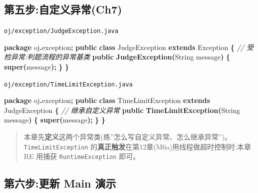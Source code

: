 \documentclass[
  11pt,
]{ctexart}
\newenvironment{Shaded}{\begin{snugshade}}{\end{snugshade}}
\newcommand{\BuiltInTok}[1]{#1}
\newcommand{\CommentTok}[1]{\textcolor[rgb]{0.56,0.35,0.01}{\textit{#1}}}
\newcommand{\FunctionTok}[1]{\textcolor[rgb]{0.13,0.29,0.53}{\textbf{#1}}}
\newcommand{\ImportTok}[1]{#1}
\newcommand{\KeywordTok}[1]{\textcolor[rgb]{0.13,0.29,0.53}{\textbf{#1}}}
\newcommand{\NormalTok}[1]{#1}
\newcommand{\OperatorTok}[1]{\textcolor[rgb]{0.81,0.36,0.00}{\textbf{#1}}}
\begin{document}
\hypertarget{ux7b2cux4e94ux6b65ux81eaux5b9aux4e49ux5f02ux5e38ch7}{%
\subsection{第五步:自定义异常(Ch7)}\label{ux7b2cux4e94ux6b65ux81eaux5b9aux4e49ux5f02ux5e38ch7}}

\texttt{oj/exception/JudgeException.java}

\begin{Shaded}
\begin{Highlighting}[]
\KeywordTok{package}\ImportTok{ oj}\OperatorTok{.}\ImportTok{exception}\OperatorTok{;}
\KeywordTok{public} \KeywordTok{class}\NormalTok{ JudgeException }\KeywordTok{extends} \BuiltInTok{Exception} \OperatorTok{\{}     \CommentTok{// 受检异常:判题流程的异常基类}
    \KeywordTok{public} \FunctionTok{JudgeException}\OperatorTok{(}\BuiltInTok{String}\NormalTok{ message}\OperatorTok{)} \OperatorTok{\{} \KeywordTok{super}\OperatorTok{(}\NormalTok{message}\OperatorTok{);} \OperatorTok{\}}
\OperatorTok{\}}
\end{Highlighting}
\end{Shaded}

\texttt{oj/exception/TimeLimitException.java}

\begin{Shaded}
\begin{Highlighting}[]
\KeywordTok{package}\ImportTok{ oj}\OperatorTok{.}\ImportTok{exception}\OperatorTok{;}
\KeywordTok{public} \KeywordTok{class}\NormalTok{ TimeLimitException }\KeywordTok{extends}\NormalTok{ JudgeException }\OperatorTok{\{}   \CommentTok{// 继承自定义异常}
    \KeywordTok{public} \FunctionTok{TimeLimitException}\OperatorTok{(}\BuiltInTok{String}\NormalTok{ message}\OperatorTok{)} \OperatorTok{\{} \KeywordTok{super}\OperatorTok{(}\NormalTok{message}\OperatorTok{);} \OperatorTok{\}}
\OperatorTok{\}}
\end{Highlighting}
\end{Shaded}

\begin{quote}
本章先\textbf{定义}这两个异常类(练''怎么写自定义异常、怎么继承异常'')。\texttt{TimeLimitException}
的\textbf{真正触发}在第12章(M6a)用线程做超时控制时;本章 RE 用捕获
\texttt{RuntimeException} 即可。
\end{quote}

\hypertarget{ux7b2cux516dux6b65ux66f4ux65b0-main-ux6f14ux793a}{%
\subsection{第六步:更新 Main
演示}\label{ux7b2cux516dux6b65ux66f4ux65b0-main-ux6f14ux793a}}
\end{document}
